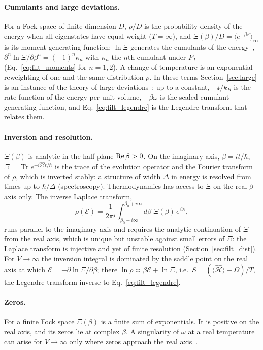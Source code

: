 \documentclass[10pt,a4paper]{article}
\theoremstyle{plain}
\newcommand{\Tr}{\operatorname{Tr}}
\newcommand{\enrg}{\mathcal{E}}  %
\newcommand{\lds}{\mathscr{s}}  %
\begin{document}
\paragraph{Cumulants and large deviations.} For a Fock space of finite
dimension $D$, $\rho/D$ is the probability density of the energy when all
eigenstates have equal weight ($T=\infty$), and
$\Xi(\beta)/D=\langle e^{-\beta\enrg}\rangle_\infty$ is its moment-generating
function: $\ln\Xi$ generates the cumulants of the
energy~\cite[Sec.~4.3]{Honerkamp},
$\partial^{n}\ln\Xi/\partial\beta^{n}=(-1)^{n}\kappa_n$ with $\kappa_n$ the
$n$th cumulant under $P_T$ (Eq.~\eqref{eq:filt_moments} for $n=1,2$). A
change of temperature is an exponential reweighting of one and the same
distribution $\rho$. In these terms Section~\ref{sec:large} is an instance
of the theory of large deviations~\cite{Touchette2009}: up to a constant,
$-\lds/k_B$ is the rate function of the energy per unit volume, $-\beta\omega$
is the scaled cumulant-generating function, and
Eq.~\eqref{eq:filt_legendre} is the Legendre transform that relates them.

\paragraph{Inversion and resolution.} $\Xi(\beta)$ is analytic in the
half-plane ${\rm Re}\,\beta>0$. On the imaginary axis, $\beta=it/\hbar$,
$\Xi=\Tr e^{-i\hat{\mathcal H}t/\hbar}$ is the trace of the evolution
operator and the Fourier transform of $\rho$, which is inverted stably: a
structure of width $\Delta$ in energy is resolved from times up to
$\hbar/\Delta$ (spectroscopy). Thermodynamics has access to $\Xi$ on the real
$\beta$ axis only. The inverse Laplace transform,
\[
  \rho(\enrg)=\frac{1}{2\pi i}\int_{\beta_0-i\infty}^{\beta_0+i\infty}
  d\beta\;\Xi(\beta)\,e^{\beta\enrg} ,
\]
runs parallel to the imaginary axis and requires the analytic continuation
of $\Xi$ from the real axis, which is unique but unstable against small
errors of $\Xi$: the Laplace transform is injective and yet of finite
resolution (Section~\ref{sec:filt_dist}). For $V\to\infty$ the inversion
integral is dominated by the saddle point on the real axis at which
$\enrg=-\partial\ln\Xi/\partial\beta$; there
$\ln\rho\asymp\beta\enrg+\ln\Xi$, i.e.\
$S=(\langle\hat{\mathcal H}\rangle-\Omega)/T$, the Legendre transform inverse
to Eq.~\eqref{eq:filt_legendre}.

\paragraph{Zeros.} For a finite Fock space $\Xi(\beta)$ is a finite sum of
exponentials. It is positive on the real axis, and its zeros lie at complex
$\beta$. A singularity of $\omega$ at a real temperature can arise for
$V\to\infty$ only where zeros approach the real axis~\cite{Fisher1965}.
\end{document}
